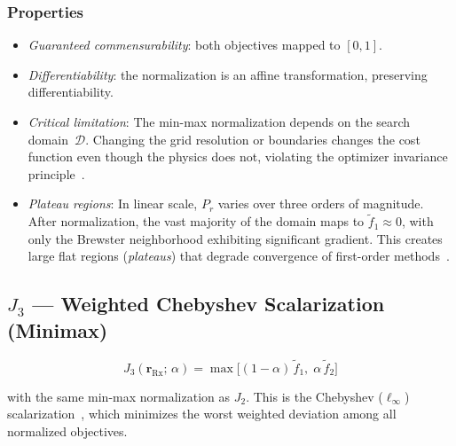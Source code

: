 \documentclass[journal]{IEEEtran}
\newcommand{\Rx}{\mathrm{Rx}}
\newcommand{\rRx}{\mathbf{r}_{\Rx}}
\begin{document}
\subsubsection*{Properties}
\begin{itemize}
  \item \emph{Guaranteed commensurability}: both objectives mapped to $[0,1]$.
  \item \emph{Differentiability}: the normalization is an affine transformation,
    preserving differentiability.
  \item \emph{Critical limitation}: The min-max normalization depends on the
    search domain~$\mathcal{D}$. Changing the grid resolution or boundaries
    changes the cost function even though the physics does not, violating the
    optimizer invariance principle~\cite{nocedal2006}.
  \item \emph{Plateau regions}: In linear scale, $P_r$ varies over three orders
    of magnitude. After normalization, the vast majority of the domain maps to
    $\tilde{f}_1 \approx 0$, with only the Brewster neighborhood exhibiting
    significant gradient. This creates large flat regions (\emph{plateaus}) that
    degrade convergence of first-order methods~\cite{nocedal2006}.
\end{itemize}

\subsection{\texorpdfstring{$J_3$}{J3} — Weighted Chebyshev Scalarization (Minimax)}

\begin{equation}
  J_3(\rRx;\,\alpha) =
    \max\!\bigl[(1-\alpha)\,\tilde{f}_1,\;\alpha\,\tilde{f}_2\bigr]
  \label{eq:J3}
\end{equation}

with the same min-max normalization as $J_2$. This is the Chebyshev
($\ell_\infty$) scalarization~\cite{messac2003}, which minimizes the worst
weighted deviation among all normalized objectives.
\end{document}
